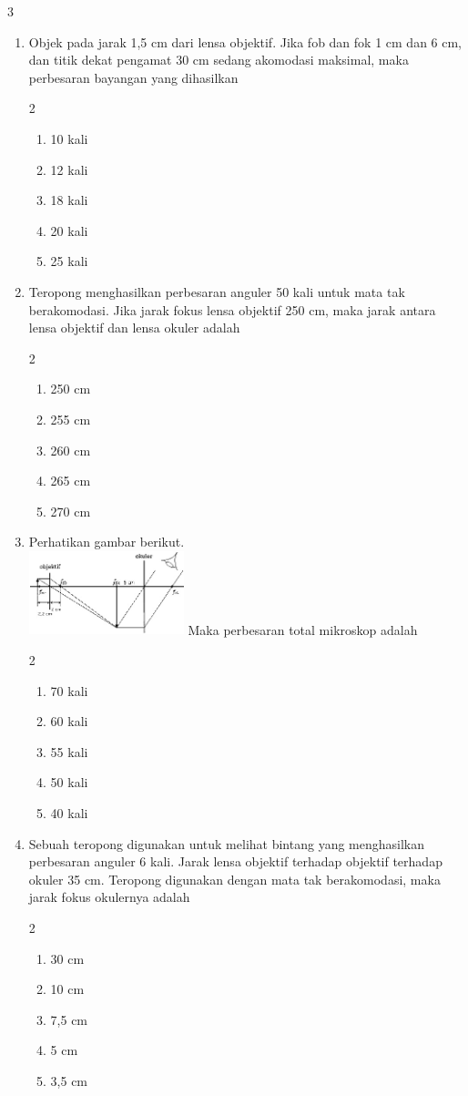 \documentclass[10pt,a4paper]{extarticle}
\newcommand{\pilgani}[1]{                            \vspace{-0.3cm}\begin{multicols}{2}
 \begin{enumerate}[label=\Alph*., itemsep=0pt,topsep=0pt,leftmargin=*,align=Center]#1                     \end{enumerate}
 \phantom{ini cuma sapi, wedus, dan ayam}
 \end{multicols}}
\begin{document}
\begin{multicols}{3}
\begin{enumerate}
\item Objek pada jarak 1,5 cm dari lensa objektif. Jika fob dan fok 1 cm dan 6 cm, dan titik dekat pengamat 30 cm sedang akomodasi maksimal, maka perbesaran bayangan yang dihasilkan
\pilgani{
   \item 10 kali
   \item 12 kali
   \item 18 kali
   \item 20 kali
   \item 25 kali}
\vspace{2cm}
\item Teropong menghasilkan perbesaran anguler 50 kali untuk mata tak berakomodasi. Jika jarak fokus lensa objektif 250 cm, maka jarak antara lensa objektif dan lensa okuler adalah
\pilgani{
   \item 250 cm
   \item 255 cm
   \item 260 cm
   \item 265 cm
   \item 270 cm
}
\vspace{2cm}

\item Perhatikan gambar berikut.\\ 
\includegraphics[width=4.5cm]{pic/lab-4}
Maka perbesaran total mikroskop adalah
\pilgani{
   \item 70 kali
   \item 60 kali
   \item 55 kali
   \item 50 kali
   \item 40 kali}
   \vspace{2cm}

\item Sebuah teropong digunakan untuk melihat bintang yang menghasilkan perbesaran anguler 6 kali. Jarak lensa objektif terhadap objektif terhadap okuler 35 cm. Teropong digunakan dengan mata tak berakomodasi, maka jarak fokus okulernya adalah
\pilgani{
   \item 30 cm
   \item 10 cm
   \item 7,5 cm
   \item 5 cm
   \item 3,5 cm
}
\vspace{2cm}


\end{enumerate}
\end{multicols}
\end{document}
